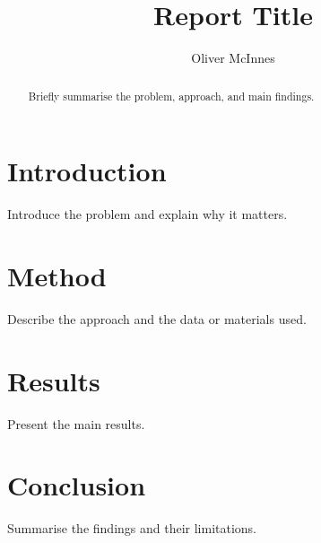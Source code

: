 \documentclass[10pt,twocolumn]{article}
\title{Report Title}
\author{Oliver McInnes}
\date{}
\begin{document}
\maketitle

\begin{abstract}
	Briefly summarise the problem, approach, and main findings.
\end{abstract}

\section{Introduction}
Introduce the problem and explain why it matters.

\section{Method}
Describe the approach and the data or materials used.

\section{Results}
Present the main results.

\section{Conclusion}
Summarise the findings and their limitations.
\end{document}
